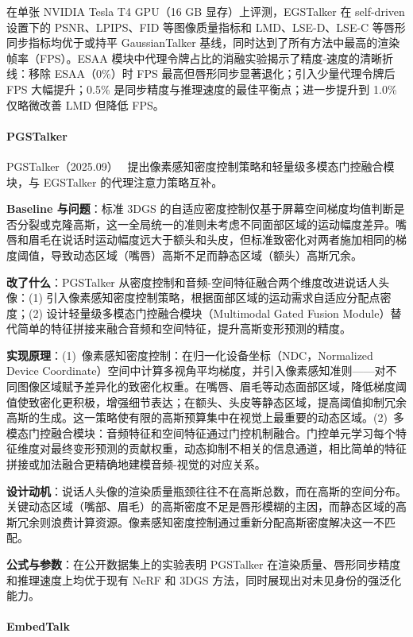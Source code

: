 在单张 NVIDIA Tesla T4 GPU（16 GB 显存）上评测，EGSTalker 在 self-driven 设置下的 PSNR、LPIPS、FID 等图像质量指标和 LMD、LSE-D、LSE-C 等唇形同步指标均优于或持平 GaussianTalker 基线，同时达到了所有方法中最高的渲染帧率（FPS）。ESAA 模块中代理令牌占比的消融实验揭示了精度-速度的清晰折线：移除 ESAA（0\%）时 FPS 最高但唇形同步显著退化；引入少量代理令牌后 FPS 大幅提升；0.5\% 是同步精度与推理速度的最佳平衡点；进一步提升到 1.0\% 仅略微改善 LMD 但降低 FPS。

\paragraph{PGSTalker}

PGSTalker（2025.09）~\cite{2509_16922} 提出像素感知密度控制策略和轻量级多模态门控融合模块，与 EGSTalker 的代理注意力策略互补。

\textbf{Baseline 与问题}：标准 3DGS 的自适应密度控制仅基于屏幕空间梯度均值判断是否分裂或克隆高斯，这一全局统一的准则未考虑不同面部区域的运动幅度差异。嘴唇和眉毛在说话时运动幅度远大于额头和头皮，但标准致密化对两者施加相同的梯度阈值，导致动态区域（嘴唇）高斯不足而静态区域（额头）高斯冗余。

\textbf{改了什么}：PGSTalker 从密度控制和音频-空间特征融合两个维度改进说话人头像：(1) 引入像素感知密度控制策略，根据面部区域的运动需求自适应分配点密度；(2) 设计轻量级多模态门控融合模块（Multimodal Gated Fusion Module）替代简单的特征拼接来融合音频和空间特征，提升高斯变形预测的精度。

\textbf{实现原理}：(1)~像素感知密度控制：在归一化设备坐标（NDC，Normalized Device Coordinate）空间中计算多视角平均梯度，并引入像素感知准则——对不同图像区域赋予差异化的致密化权重。在嘴唇、眉毛等动态面部区域，降低梯度阈值使致密化更积极，增强细节表达；在额头、头皮等静态区域，提高阈值抑制冗余高斯的生成。这一策略使有限的高斯预算集中在视觉上最重要的动态区域。(2)~多模态门控融合模块：音频特征和空间特征通过门控机制融合。门控单元学习每个特征维度对最终变形预测的贡献权重，动态抑制不相关的信息通道，相比简单的特征拼接或加法融合更精确地建模音频-视觉的对应关系。

\textbf{设计动机}：说话人头像的渲染质量瓶颈往往不在高斯总数，而在高斯的空间分布。关键动态区域（嘴部、眉毛）的高斯密度不足是唇形模糊的主因，而静态区域的高斯冗余则浪费计算资源。像素感知密度控制通过重新分配高斯密度解决这一不匹配。

\textbf{公式与参数}：在公开数据集上的实验表明 PGSTalker 在渲染质量、唇形同步精度和推理速度上均优于现有 NeRF 和 3DGS 方法，同时展现出对未见身份的强泛化能力。

\paragraph{EmbedTalk}

